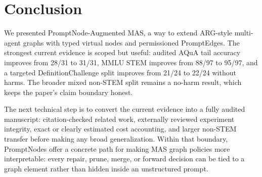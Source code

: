 \section{Conclusion}
\label{sec:conclusion}

We presented PromptNode-Augmented MAS, a way to extend ARG-style multi-agent graphs with typed virtual nodes and permissioned PromptEdges. The strongest current evidence is scoped but useful: audited AQuA tail accuracy improves from 28/31 to 31/31, MMLU STEM improves from 88/97 to 95/97, and a targeted DefinitionChallenge split improves from 21/24 to 22/24 without harms. The broader mixed non-STEM split remains a no-harm result, which keeps the paper's claim boundary honest.

The next technical step is to convert the current evidence into a fully audited manuscript: citation-checked related work, externally reviewed experiment integrity, exact or clearly estimated cost accounting, and larger non-STEM transfer before making any broad generalization. Within that boundary, PromptNodes offer a concrete path for making MAS graph policies more interpretable: every repair, prune, merge, or forward decision can be tied to a graph element rather than hidden inside an unstructured prompt.
